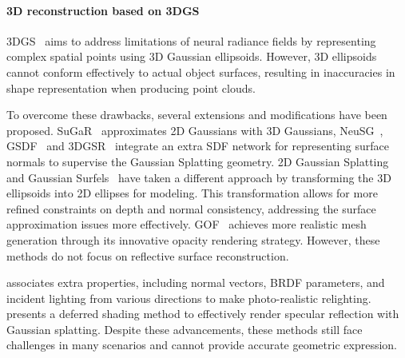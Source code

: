 \paragraph{3D reconstruction based on 3DGS}

3DGS~\cite{kerbl20233d} aims to address limitations of  neural radiance fields by representing complex spatial points using 3D Gaussian ellipsoids. 
However, 3D ellipsoids cannot conform effectively to actual object surfaces, resulting in inaccuracies in shape representation when producing point clouds. 

To overcome these drawbacks, several extensions and modifications have been proposed. SuGaR~\cite{guedon2024sugar} approximates 2D Gaussians with
3D Gaussians, NeuSG~\cite{chen2023neusg}, GSDF~\cite{yu2024gsdf} and 3DGSR~\cite{lyu20243dgsr} integrate an extra SDF network for representing surface normals to supervise the Gaussian Splatting geometry. 
2D Gaussian Splatting~\cite{huang20242d} and Gaussian Surfels~\cite{dai2024high} have taken a different approach by transforming the 3D ellipsoids into 2D ellipses for modeling. This transformation allows for more refined constraints on depth and normal consistency, addressing the surface approximation issues more effectively. 
GOF~\cite{yu2024gaussian} achieves more realistic mesh generation through its innovative opacity rendering strategy.
However, these methods do not focus on reflective surface reconstruction.

\relight associates extra properties, including normal vectors, BRDF parameters,
and incident lighting from various directions to make photo-realistic relighting. 
\dr presents a deferred shading method to effectively render specular reflection with Gaussian splatting. Despite these advancements, these methods still face challenges in many scenarios and cannot provide accurate geometric expression.
\vspace{-1.0em}


